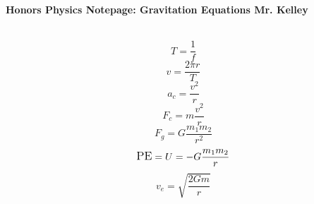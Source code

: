 \documentclass[12pt]{report}
\begin{document}
{\bf{Honors Physics} \hfill Notepage: Gravitation Equations \hfill {Mr. Kelley}} \\ \\

\vspace{1cm}


{\Large $$T = \frac{1}{f}$$ \vspace{.5cm} $$v = \frac{2\pi r}{T}$$ \vspace{.5cm} $$a_c = \frac{v^2}{r}$$ \vspace{.5cm} $$F_c = m \frac{v^2}{r} $$ \vspace{.5cm} $$F_g = G \frac{m_1 m_2}{r^2}$$ \vspace{.5cm} $$\mbox{\large PE} = U = -G\frac{m_1 m_2}{r}$$ \vspace{.5cm} $$v_e = \sqrt{\frac{2Gm}{r}}$$}
\end{document}
